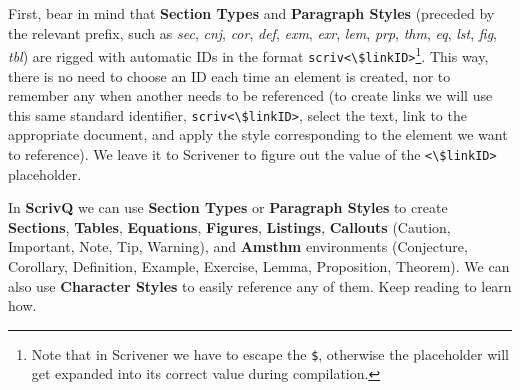 \documentclass[
  12pt,
  a4paper,
  oneside,
  titlepage,
  toclink=all,
  toc=bibliography]{scrbook}
\theoremstyle{definition}
\theoremstyle{plain}
\theoremstyle{plain}
\theoremstyle{plain}
\theoremstyle{plain}
\theoremstyle{definition}
\theoremstyle{definition}
\theoremstyle{plain}
\theoremstyle{remark}
\begin{document}
{}First,
bear in mind that \textbf{Section Types} and \textbf{Paragraph Styles}
(preceded by the relevant prefix, such as \emph{sec}, \emph{cnj},
\emph{cor}, \emph{def}, \emph{exm}, \emph{exr}, \emph{lem}, \emph{prp},
\emph{thm}, \emph{eq}, \emph{lst}, \emph{fig}, \emph{tbl}) are rigged
with automatic IDs in the format
\texttt{scriv\textless{}\textbackslash{}\$linkID\textgreater{}}\footnote{Note
  that in Scrivener we have to escape the \texttt{\$}, otherwise the
  placeholder will get expanded into its correct value during
  compilation.}. This way, there is no need to choose an ID each time an
element is created, nor to remember any when another needs to be
referenced (to create links we will use this same standard identifier,
\texttt{scriv\textless{}\textbackslash{}\$linkID\textgreater{}}, select
the text, link to the appropriate document, and apply the style
corresponding to the element we want to reference). We leave it to
Scrivener to figure out the value of the
\texttt{\textless{}\textbackslash{}\$linkID\textgreater{}} placeholder.

\begin{tcolorbox}[enhanced jigsaw, left=2mm, colframe=quarto-callout-note-color-frame, bottomtitle=1mm, colback=white, coltitle=black, title=\textcolor{quarto-callout-note-color}{\faInfo}\hspace{0.5em}{Translating Quarto into Scrivener}, toprule=.15mm, rightrule=.15mm, opacityback=0, breakable, toptitle=1mm, titlerule=0mm, colbacktitle=quarto-callout-note-color!10!white, arc=.35mm, bottomrule=.15mm, leftrule=.75mm, opacitybacktitle=0.6]

In \textbf{ScrivQ} we can use \textbf{Section Types} or
\textbf{Paragraph Styles} to create \textbf{Sections}, \textbf{Tables},
\textbf{Equations}, \textbf{Figures}, \textbf{Listings},
\textbf{Callouts} (Caution, Important, Note, Tip, Warning), and
\textbf{Amsthm} environments (Conjecture, Corollary, Definition,
Example, Exercise, Lemma, Proposition, Theorem). We can also use
\textbf{Character Styles} to easily reference any of them. Keep reading
to learn how.

\end{tcolorbox}
\end{document}
